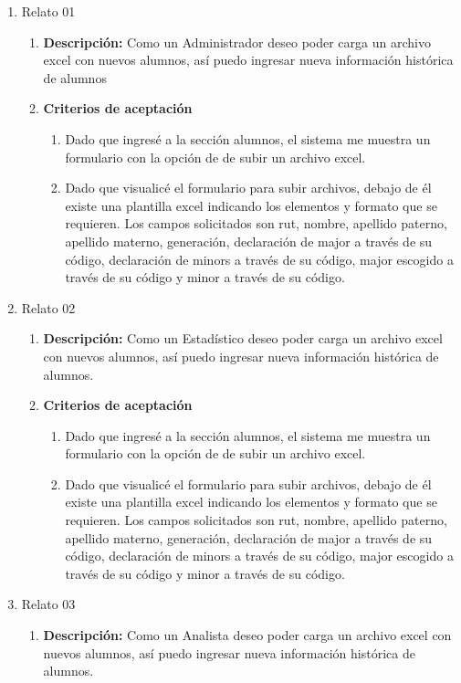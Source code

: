 \begin{enumerate}
	\item Relato 01
		\begin{enumerate}
			\item \textbf{Descripción:} Como un Administrador deseo poder carga un archivo excel con nuevos alumnos, así puedo ingresar nueva información histórica de alumnos
			\item \textbf{Criterios de aceptación}
				\begin{enumerate}
					\item Dado que ingresé a la sección alumnos, el sistema me muestra un formulario con la opción de de subir un archivo excel.
					\item Dado que visualicé el formulario para subir archivos, debajo de él existe una plantilla excel indicando los elementos y formato que se requieren. Los campos solicitados son rut, nombre, apellido paterno, apellido materno, generación, declaración de major a través de su código, declaración de minors a través de su código, major escogido a través de su código y minor a través de su código.
				\end{enumerate}
		\end{enumerate}
	\item Relato 02
		\begin{enumerate}
			\item \textbf{Descripción:} Como un Estadístico deseo poder carga un archivo excel con nuevos alumnos, así puedo ingresar nueva información histórica de alumnos.
			\item \textbf{Criterios de aceptación}
				\begin{enumerate}
					\item Dado que ingresé a la sección alumnos, el sistema me muestra un formulario con la opción de de subir un archivo excel.
					\item Dado que visualicé el formulario para subir archivos, debajo de él existe una plantilla excel indicando los elementos y formato que se requieren. Los campos solicitados son rut, nombre, apellido paterno, apellido materno, generación, declaración de major a través de su código, declaración de minors a través de su código, major escogido a través de su código y minor a través de su código.
				\end{enumerate}
		\end{enumerate}
	\item Relato 03
		\begin{enumerate}
			\item \textbf{Descripción:} Como un Analista deseo poder carga un archivo excel con nuevos alumnos, así puedo ingresar nueva información histórica de alumnos.

\end{enumerate}
\end{enumerate}
